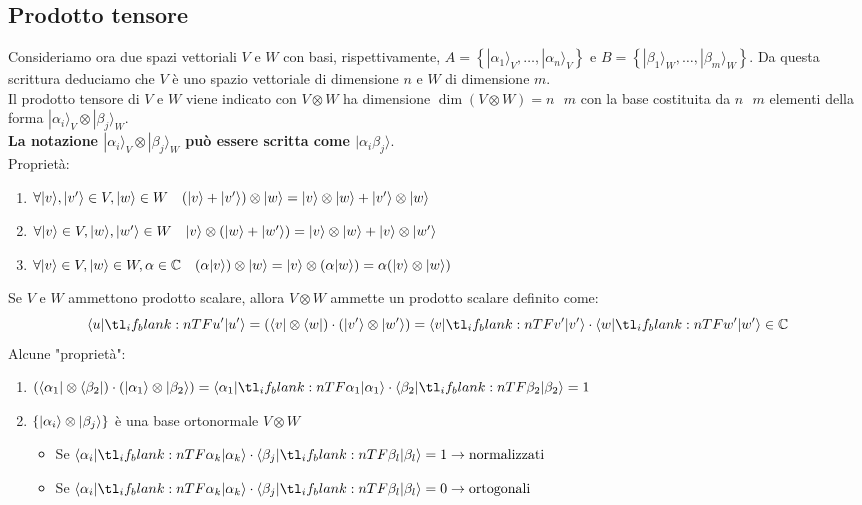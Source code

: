 \documentclass[12pt, a4paper]{report}
\begin{document}
\subsection{Prodotto tensore}
Consideriamo ora due spazi vettoriali $V$ e $W$ con basi, rispettivamente, $A=\left\{|\alpha_{1}\rangle_{V},\ldots,|\alpha_{n}\rangle_{V}\right\}$ e $B=\left\{|\beta_{1}\rangle_{W},\ldots,|\beta_{m}\rangle_{W}\right\}$. Da questa scrittura deduciamo che $V$ è uno spazio vettoriale di dimensione $n$ e $W$ di dimensione $m$.\\
Il prodotto tensore di $V$ e $W$ viene indicato con $V\otimes W$ ha dimensione $\dim(V\otimes W)=n\text{ }m$  con la base costituita da $n\text{ }m$ elementi della forma $|\alpha_{i}\rangle_{V}\otimes|\beta_{j}\rangle_{W}$.\\
\textbf{La notazione $|\alpha_{i}\rangle_{V}\otimes|\beta_{j}\rangle_{W}$ può essere scritta come $|\alpha_{i}\beta_{j}\rangle$}.\\
Proprietà:
\begin{enumerate}
    \item $\forall | v \rangle,| v' \rangle \in V, | w \rangle \in W \quad (| v \rangle+| v' \rangle)\otimes| w \rangle = | v \rangle\otimes| w \rangle+| v' \rangle\otimes| w \rangle$
    \item $\forall| v \rangle\in V, | w \rangle,| w' \rangle\in W \quad | v \rangle\otimes (| w \rangle+| w' \rangle)=| v \rangle\otimes| w \rangle+| v \rangle\otimes| w' \rangle$
    \item $\forall| v \rangle\in V,| w \rangle\in W,\alpha \in \mathbb{C} \quad (\alpha| v \rangle)\otimes| w \rangle=| v \rangle\otimes(\alpha| w \rangle)=\alpha(| v \rangle\otimes| w \rangle)$
\end{enumerate}
Se $V$ e $W$ ammettono prodotto scalare, allora $V\otimes W$ ammette un prodotto scalare definito come:
\begin{equation*}
    \braket{u}{u'}=(\bra{v}\otimes\bra{w})\cdot(\ket{v'}\otimes\ket{w'})=\braket{v}{v'}\cdot\braket{w}{w'} \in \mathbb{C}
\end{equation*}
Alcune "proprietà":
\begin{enumerate}
    \item $(\bra{\alpha_{1}}\otimes\bra{\beta_{2}})\cdot(\ket{\alpha_{1}}\otimes\ket{\beta_{2}}) = \braket{\alpha_{1}}{\alpha_{1}}\cdot\braket{\beta_{2}}{\beta_{2}}=1$
    \item $\left\{| \alpha_{i} \rangle\otimes| \beta_{j} \rangle\right\}$ è una base ortonormale $V\otimes W$ \begin{itemize}
        \item Se $\braket{\alpha_{i}}{\alpha_{k}}\cdot\braket{\beta_{j}}{\beta_{l}}=1 \rightarrow \text{normalizzati}$
        \item Se $\braket{\alpha_{i}}{\alpha_{k}}\cdot\braket{\beta_{j}}{\beta_{l}}=0 \rightarrow \text{ortogonali}$
    \end{itemize}
\end{enumerate}
\end{document}
